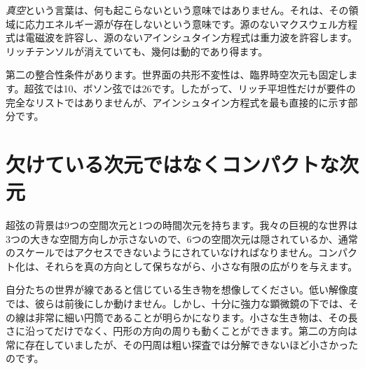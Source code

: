 \emph{真空}という言葉は、何も起こらないという意味ではありません。それは、その領域に応力エネルギー源が存在しないという意味です。源のないマクスウェル方程式は電磁波を許容し、源のないアインシュタイン方程式は重力波を許容します。リッチテンソルが消えていても、幾何は動的であり得ます。

\begin{classroomqa}
\end{classroomqa}

第二の整合性条件があります。世界面の共形不変性は、臨界時空次元も固定します。超弦では10、ボソン弦では26です。したがって、リッチ平坦性だけが要件の完全なリストではありませんが、アインシュタイン方程式を最も直接的に示す部分です。

\section{欠けている次元ではなくコンパクトな次元}

超弦の背景は9つの空間次元と1つの時間次元を持ちます。我々の巨視的な世界は3つの大きな空間方向しか示さないので、6つの空間次元は隠されているか、通常のスケールではアクセスできないようにされていなければなりません。コンパクト化は、それらを真の方向として保ちながら、小さな有限の広がりを与えます。

\begin{classroomqa}
\end{classroomqa}

自分たちの世界が線であると信じている生き物を想像してください。低い解像度では、彼らは前後にしか動けません。しかし、十分に強力な顕微鏡の下では、その線は非常に細い円筒であることが明らかになります。小さな生き物は、その長さに沿ってだけでなく、円形の方向の周りも動くことができます。第二の方向は常に存在していましたが、その円周は粗い探査では分解できないほど小さかったのです。

